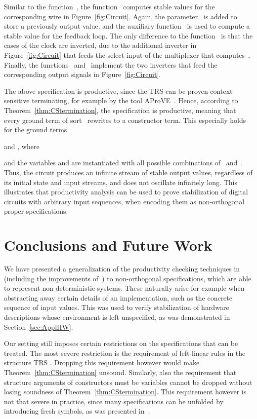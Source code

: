 \documentclass{eptcs}
\begin{document}
Similar to the function~, the function~ computes stable
values for the corresponding wire in Figure~\ref{fig:Circuit}. Again, the
parameter~ is added to store a previously output value, and the
auxiliary function~ is used to compute a stable value for the
feedback loop. The only difference to the function~ is that the cases
of the clock are inverted, due to the additional inverter in
Figure~\ref{fig:Circuit} that feeds the select input of the multiplexer that
computes~.
Finally, the functions~ and~ implement the two inverters
that feed the corresponding output signals in Figure~\ref{fig:Circuit}.

The above specification is productive, since the TRS  can be
proven context-sensitive terminating, for example by the tool
AProVE~\cite{AProVE06}.
Hence, according to Theorem~\ref{thm:CStermination}, the specification is
productive, meaning that every ground term of sort~ rewrites to a constructor
term. This especially holds for the ground terms

and
,
where

and the variables  and  are instantiated with all
possible combinations of~ and~. Thus, the circuit produces an
infinite stream of stable output values, regardless of its initial state and
input streams, and does not oscillate infinitely long. This illustrates that
productivity analysis can be used to prove stabilization of digital circuits
with arbitrary input sequences, when encoding them as non-orthogonal
proper specifications.


\section{Conclusions and Future Work}
\label{sec:Conclusions}

We have presented a generalization of the productivity checking techniques
in~\cite{ZR10} (including the improvements of~\cite{EH11})
to non-orthogonal specifications, which are able to represent non-deterministic
systems. These naturally arise for example when abstracting away certain details
of an implementation, such as the concrete sequence of input values. This was
used to verify stabilization of hardware descriptions whose environment is left
unspecified, as was demonstrated in Section~\ref{sec:ApplHW}.

Our setting still imposes certain restrictions on the specifications that can be
treated. The most severe restriction is the requirement of left-linear rules in
the structure TRS .
Dropping this requirement however would make Theorem~\ref{thm:CStermination}
unsound.
Similarly, also the requirement that structure arguments of constructors must be
variables cannot be dropped without losing soundness of
Theorem~\ref{thm:CStermination}. This requirement however is not that severe in
practice, since many specifications can be unfolded by introducing fresh
symbols, as was presented in~\cite{EH11,Z09}.
\end{document}
